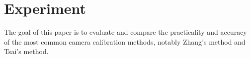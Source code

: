 \section{Experiment}

The goal of this paper is to evaluate and compare the practicality and accuracy of the most common camera calibration methods, notably Zhang's method and Tsai's method.